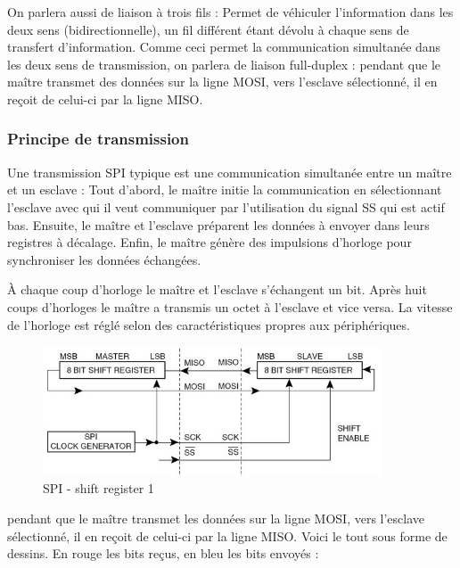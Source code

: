 \documentclass[french,a4paper,12pt]{report}
\begin{document}
	On parlera aussi de liaison à trois fils : Permet de véhiculer l’information dans les deux sens (bidirectionnelle), un fil différent étant dévolu à chaque sens de transfert d’information. Comme ceci permet la communication simultanée dans les deux sens de transmission, on parlera de liaison full-duplex : pendant que le maître transmet des données sur la ligne MOSI, vers l’esclave sélectionné, il en reçoit de celui-ci par la ligne MISO.

  		\subsubsection{Principe de transmission}
  		
			Une transmission SPI typique est une communication simultanée entre un maître et un esclave :
Tout d'abord, le maître initie la communication en sélectionnant l'esclave avec qui il veut communiquer par l'utilisation du signal SS qui est actif bas.
Ensuite, le maître et l'esclave préparent les données à envoyer dans leurs registres à décalage.
Enfin, le maître génère des impulsions d'horloge pour synchroniser les données échangées.
 
À chaque coup d'horloge le maître et l'esclave s'échangent un bit. Après huit coups d'horloges le maître a transmis un octet à l'esclave et vice versa. La vitesse de l'horloge est réglé selon des caractéristiques propres aux périphériques.

	\begin{figure}[!ht]
    \center
  	\includegraphics[width=10cm]{SPI3.png}
    \caption{SPI - shift register 1}
	\end{figure}
 
pendant que le maître transmet les données sur la ligne MOSI, vers l’esclave sélectionné, il en reçoit de celui-ci par la ligne MISO.
Voici le tout sous forme de dessins. En rouge les bits reçus, en bleu les bits envoyés :
\end{document}

